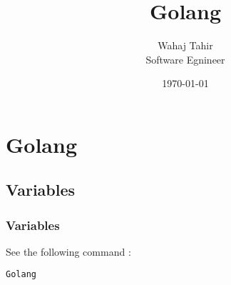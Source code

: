\documentclass[a4paper,12pt]{article}
\title{Golang}
\author{Wahaj Tahir \\ Software Egnineer}
\date{\today}
\begin{document}
\maketitle
\tableofcontents
\newpage
\section{Golang}
\subsection{Variables}
\subsubsection{Variables}
\noindent See the following command :
\begin{lstlisting}[language=bash]
 Golang
\end{lstlisting}
\end{document}
